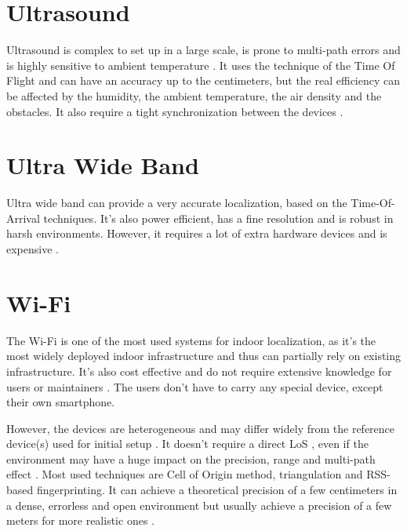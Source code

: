 \section{Ultrasound}

Ultrasound is complex to set up in a large scale, is prone to multi-path errors and is highly sensitive to ambient temperature \cite{mainetti_survey_2014}. It uses the technique of the Time Of Flight and can have an accuracy up to the centimeters, but the real efficiency can be affected by the humidity, the ambient temperature, the air density and the obstacles. It also require a tight synchronization between the devices \cite{shang_overview_2022} \cite{mainetti_survey_2014}.

\section{Ultra Wide Band}

Ultra wide band can provide a very accurate localization, based on the Time-Of-Arrival techniques. It's also power efficient, has a fine resolution and is robust in harsh environments. However, it requires a lot of extra hardware devices \cite{spachos_ble_2020} and is expensive \cite{shang_overview_2022}.

\section{Wi-Fi}

The Wi-Fi is one of the most used systems for indoor localization, as it's the most widely deployed indoor infrastructure and thus can partially rely on existing infrastructure. It's also cost effective \cite{mainetti_survey_2014} and do not require extensive knowledge for users or maintainers \cite{shang_overview_2022}. The users don't have to carry any special device, except their own smartphone.

However, the devices are heterogeneous and may differ widely from the reference device(s) used for initial setup \cite{liu_survey_2020}. It doesn't require a direct LoS \cite{mainetti_survey_2014}, even if the environment may have a huge impact on the precision, range and multi-path effect \cite{liu_survey_2020}. Most used techniques are Cell of Origin method, triangulation and RSS-based fingerprinting. It can achieve a theoretical precision of a few centimeters in a dense, errorless and open environment but usually achieve a precision of a few meters for more realistic ones \cite{liu_survey_2020}.

